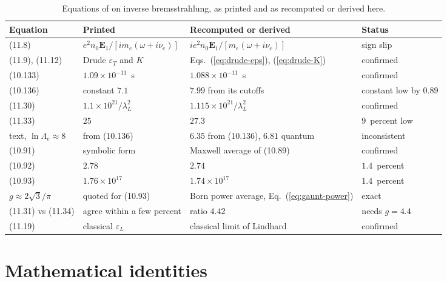 \documentclass[11pt]{article}
\numberwithin{equation}{section}
\newcommand{\Ev}{\mathbf E}
\begin{document}
\begin{table}[ht]
\centering
\caption{Equations of \cite{Atzeni2004} on inverse bremsstrahlung, as
printed and as recomputed or derived here.}
\label{tab:atzeni}
\begin{tabular}{L{2.1cm}L{4.5cm}L{4.5cm}L{3.3cm}}
\toprule
Equation & Printed & Recomputed or derived & Status\\
\midrule
(11.8) & $e^2n_0\Ev_1/[im_e(\omega+i\nu_e)]$ & $ie^2n_0\Ev_1/[m_e(\omega+i\nu_e)]$ & sign slip\\
(11.9), (11.12) & Drude $\varepsilon_T$ and $K$ & Eqs.~(\ref*{eq:drude-eps}), (\ref*{eq:drude-K}) & confirmed\\
(10.133) & $1.09\times10^{-11}$~s & $1.088\times10^{-11}$~s & confirmed\\
(10.136) & constant $7.1$ & $7.99$ from its cutoffs & constant low by $0.89$\\
(11.30) & $1.1\times10^{21}/\lambda_L^2$ & $1.115\times10^{21}/\lambda_L^2$ & confirmed\\
(11.33) & $25$ & $27.3$ & $9$~percent low\\
text, $\ln\Lambda_e\approx8$ & from (10.136) & $6.35$ from (10.136), $6.81$ quantum & inconsistent\\
(10.91) & symbolic form & Maxwell average of (10.89) & confirmed\\
(10.92) & $2.78$ & $2.74$ & $1.4$~percent\\
(10.93) & $1.76\times10^{17}$ & $1.74\times10^{17}$ & $1.4$~percent\\
$g\approx2\sqrt3/\pi$ & quoted for (10.93) & Born power average, Eq.~(\ref*{eq:gaunt-power}) & exact\\
(11.31) vs (11.34) & agree within a few percent & ratio $4.42$ & needs $g=4.4$\\
(11.19) & classical $\varepsilon_L$ & classical limit of Lindhard & confirmed\\
\bottomrule
\end{tabular}
\end{table}


\section{Mathematical identities}
\label{app:math}
\end{document}
